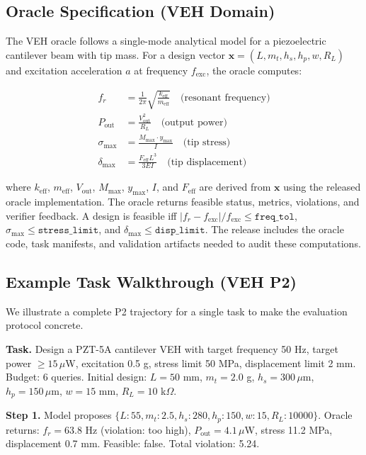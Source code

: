 \subsection{Oracle Specification (VEH Domain)}

The VEH oracle follows a single-mode analytical model for a piezoelectric cantilever beam with tip mass. For a design vector $\mathbf{x} = (L, m_t, h_s, h_p, w, R_L)$ and excitation acceleration $a$ at frequency $f_{\text{exc}}$, the oracle computes:

\begin{align}
f_r &= \frac{1}{2\pi}\sqrt{\frac{k_{\text{eff}}}{m_{\text{eff}}}} \quad\text{(resonant frequency)} \\
P_{\text{out}} &= \frac{V_{\text{out}}^2}{R_L} \quad\text{(output power)} \\
\sigma_{\max} &= \frac{M_{\max} \cdot y_{\max}}{I} \quad\text{(tip stress)} \\
\delta_{\max} &= \frac{F_{\text{eff}} L^3}{3 E I} \quad\text{(tip displacement)}
\end{align}

where $k_{\text{eff}}$, $m_{\text{eff}}$, $V_{\text{out}}$, $M_{\max}$, $y_{\max}$, \(I\), and \(F_{\text{eff}}\) are derived from $\mathbf{x}$ using the released oracle implementation. The oracle returns feasible status, metrics, violations, and verifier feedback. A design is feasible iff $|f_r-f_{\text{exc}}|/f_{\text{exc}}\le\texttt{freq\_tol}$, $\sigma_{\max}\le\texttt{stress\_limit}$, and $\delta_{\max}\le\texttt{disp\_limit}$. The release includes the oracle code, task manifests, and validation artifacts needed to audit these computations.

\subsection{Example Task Walkthrough (VEH P2)}

We illustrate a complete P2 trajectory for a single task to make the evaluation protocol concrete.

\textbf{Task.} Design a PZT-5A cantilever VEH with target frequency 50 Hz, target power $\ge 15\,\mu$W, excitation 0.5 g, stress limit 50 MPa, displacement limit 2 mm. Budget: 6 queries. Initial design: $L = 50$ mm, $m_t = 2.0$ g, $h_s = 300\,\mu$m, $h_p = 150\,\mu$m, $w = 15$ mm, $R_L = 10$ k$\Omega$.

\textbf{Step 1.} Model proposes $\{L: 55, m_t: 2.5, h_s: 280, h_p: 150, w: 15, R_L: 10000\}$. Oracle returns: $f_r = 63.8$ Hz (violation: too high), $P_{\text{out}} = 4.1\,\mu$W, stress 11.2 MPa, displacement 0.7 mm. Feasible: false. Total violation: 5.24.

